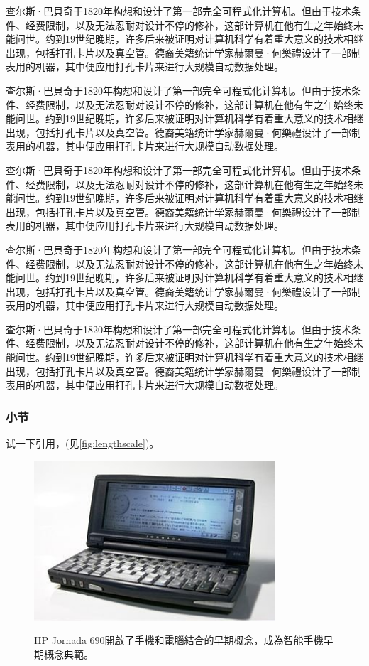 \documentclass[twoside,a4paper,12pt]{book}%
\begin{document}
查尔斯·巴貝奇于1820年构想和设计了第一部完全可程式化计算机。但由于技术条件、经费限制，以及无法忍耐对设计不停的修补，这部计算机在他有生之年始终未能问世。约到19世纪晚期，许多后来被证明对计算机科学有着重大意义的技术相继出现，包括打孔卡片以及真空管。德裔美籍统计学家赫爾曼·何樂禮设计了一部制表用的机器，其中便应用打孔卡片来进行大规模自动数据处理。

查尔斯·巴貝奇于1820年构想和设计了第一部完全可程式化计算机。但由于技术条件、经费限制，以及无法忍耐对设计不停的修补，这部计算机在他有生之年始终未能问世。约到19世纪晚期，许多后来被证明对计算机科学有着重大意义的技术相继出现，包括打孔卡片以及真空管。德裔美籍统计学家赫爾曼·何樂禮设计了一部制表用的机器，其中便应用打孔卡片来进行大规模自动数据处理。

查尔斯·巴貝奇于1820年构想和设计了第一部完全可程式化计算机。但由于技术条件、经费限制，以及无法忍耐对设计不停的修补，这部计算机在他有生之年始终未能问世。约到19世纪晚期，许多后来被证明对计算机科学有着重大意义的技术相继出现，包括打孔卡片以及真空管。德裔美籍统计学家赫爾曼·何樂禮设计了一部制表用的机器，其中便应用打孔卡片来进行大规模自动数据处理。

查尔斯·巴貝奇于1820年构想和设计了第一部完全可程式化计算机。但由于技术条件、经费限制，以及无法忍耐对设计不停的修补，这部计算机在他有生之年始终未能问世。约到19世纪晚期，许多后来被证明对计算机科学有着重大意义的技术相继出现，包括打孔卡片以及真空管。德裔美籍统计学家赫爾曼·何樂禮设计了一部制表用的机器，其中便应用打孔卡片来进行大规模自动数据处理。

查尔斯·巴貝奇于1820年构想和设计了第一部完全可程式化计算机。但由于技术条件、经费限制，以及无法忍耐对设计不停的修补，这部计算机在他有生之年始终未能问世。约到19世纪晚期，许多后来被证明对计算机科学有着重大意义的技术相继出现，包括打孔卡片以及真空管。德裔美籍统计学家赫爾曼·何樂禮设计了一部制表用的机器，其中便应用打孔卡片来进行大规模自动数据处理。


\subsubsection{小节}
试一下引用\cite{xiuwu2002}，(见\autoref{fig:lengthscale})。

\begin{figure}[htbp]
  \centering
  \includegraphics[width=0.8\textwidth]{330px-Jornada_690_HP_d.jpg} \\
  \caption[早期的智能手机]{HP Jornada 690開啟了手機和電腦結合的早期概念，成為智能手機早期概念典範。} 
  \label{fig:lengthscale}
\end{figure}
\end{document}
